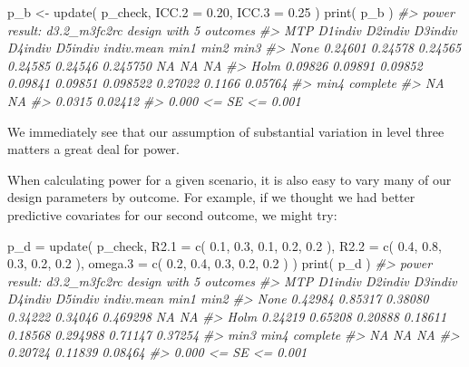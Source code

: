 \documentclass[
]{article}
\newenvironment{Shaded}{\begin{snugshade}}{\end{snugshade}}
\newcommand{\AttributeTok}[1]{\textcolor[rgb]{0.77,0.63,0.00}{#1}}
\newcommand{\CommentTok}[1]{\textcolor[rgb]{0.56,0.35,0.01}{\textit{#1}}}
\newcommand{\FloatTok}[1]{\textcolor[rgb]{0.00,0.00,0.81}{#1}}
\newcommand{\FunctionTok}[1]{\textcolor[rgb]{0.00,0.00,0.00}{#1}}
\newcommand{\NormalTok}[1]{#1}
\newcommand{\OtherTok}[1]{\textcolor[rgb]{0.56,0.35,0.01}{#1}}
\begin{document}
\begin{Shaded}
\begin{Highlighting}[]
\NormalTok{p\_b }\OtherTok{\textless{}{-}} \FunctionTok{update}\NormalTok{( p\_check, }\AttributeTok{ICC.2 =} \FloatTok{0.20}\NormalTok{, }\AttributeTok{ICC.3 =} \FloatTok{0.25}\NormalTok{ )}
\FunctionTok{print}\NormalTok{( p\_b )}
\CommentTok{\#\textgreater{} power result: d3.2\_m3fc2rc design with 5 outcomes}
\CommentTok{\#\textgreater{}   MTP D1indiv D2indiv D3indiv D4indiv D5indiv indiv.mean    min1   min2    min3}
\CommentTok{\#\textgreater{}  None 0.24601 0.24578 0.24565 0.24585 0.24546   0.245750      NA     NA      NA}
\CommentTok{\#\textgreater{}  Holm 0.09826 0.09891 0.09852 0.09841 0.09851   0.098522 0.27022 0.1166 0.05764}
\CommentTok{\#\textgreater{}    min4 complete}
\CommentTok{\#\textgreater{}      NA       NA}
\CommentTok{\#\textgreater{}  0.0315  0.02412}
\CommentTok{\#\textgreater{}  0.000 \textless{}= SE \textless{}= 0.001}
\end{Highlighting}
\end{Shaded}

We immediately see that our assumption of substantial variation in level
three matters a great deal for power.

When calculating power for a given scenario, it is also easy to vary
many of our design parameters by outcome. For example, if we thought we
had better predictive covariates for our second outcome, we might try:

\begin{Shaded}
\begin{Highlighting}[]
\NormalTok{p\_d }\OtherTok{=} \FunctionTok{update}\NormalTok{( p\_check,}
            \AttributeTok{R2.1 =} \FunctionTok{c}\NormalTok{( }\FloatTok{0.1}\NormalTok{, }\FloatTok{0.3}\NormalTok{, }\FloatTok{0.1}\NormalTok{, }\FloatTok{0.2}\NormalTok{, }\FloatTok{0.2}\NormalTok{ ),}
            \AttributeTok{R2.2 =} \FunctionTok{c}\NormalTok{( }\FloatTok{0.4}\NormalTok{, }\FloatTok{0.8}\NormalTok{, }\FloatTok{0.3}\NormalTok{, }\FloatTok{0.2}\NormalTok{, }\FloatTok{0.2}\NormalTok{ ),}
            \AttributeTok{omega.3 =} \FunctionTok{c}\NormalTok{( }\FloatTok{0.2}\NormalTok{, }\FloatTok{0.4}\NormalTok{, }\FloatTok{0.3}\NormalTok{, }\FloatTok{0.2}\NormalTok{, }\FloatTok{0.2}\NormalTok{ ) )}
\FunctionTok{print}\NormalTok{( p\_d )}
\CommentTok{\#\textgreater{} power result: d3.2\_m3fc2rc design with 5 outcomes}
\CommentTok{\#\textgreater{}   MTP D1indiv D2indiv D3indiv D4indiv D5indiv indiv.mean    min1    min2}
\CommentTok{\#\textgreater{}  None 0.42984 0.85317 0.38080 0.34222 0.34046   0.469298      NA      NA}
\CommentTok{\#\textgreater{}  Holm 0.24219 0.65208 0.20888 0.18611 0.18568   0.294988 0.71147 0.37254}
\CommentTok{\#\textgreater{}     min3    min4 complete}
\CommentTok{\#\textgreater{}       NA      NA       NA}
\CommentTok{\#\textgreater{}  0.20724 0.11839  0.08464}
\CommentTok{\#\textgreater{}  0.000 \textless{}= SE \textless{}= 0.001}
\end{Highlighting}
\end{Shaded}
\end{document}
